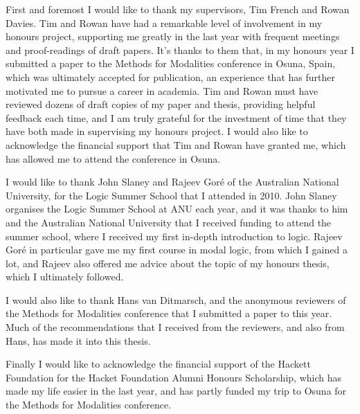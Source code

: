 \begin{acknowledgements}
First and foremost I would like to thank my supervisors, Tim French and Rowan
Davies. Tim and Rowan have had a remarkable level of involvement in my honours
project, supporting me greatly in the last year with frequent meetings and
proof-readings of draft papers. It's thanks to them that, in my honours year I
submitted a paper to the Methods for Modalities conference in Osuna, Spain,
which was ultimately accepted for publication, an experience that has further
motivated me to pursue a career in academia. Tim and Rowan must have reviewed
dozens of draft copies of my paper and thesis, providing helpful feedback each
time, and I am truly grateful for the investment of time that they have both
made in supervising my honours project. I would also like to acknowledge the
financial support that Tim and Rowan have granted me, which has allowed me to
attend the conference in Osuna.

I would like to thank John Slaney and Rajeev Gor\'{e} of the Australian National
University, for the Logic Summer School that I attended in 2010. John Slaney
organises the Logic Summer School at ANU each year, and it was thanks to him and
the Australian National University that I received funding to attend the summer
school, where I received my first in-depth introduction to logic. Rajeev
Gor\'{e} in particular gave me my first course in modal logic, from which I
gained a lot, and Rajeev also offered me advice about the topic of my honours
thesis, which I ultimately followed.

I would also like to thank Hans van Ditmarsch, and the anonymous reviewers of
the Methods for Modalities conference that I submitted a paper to this year.
Much of the recommendations that I received from the reviewers, and also from
Hans, has made it into this thesis.

Finally I would like to acknowledge the financial support of the Hackett
Foundation for the Hacket Foundation Alumni Honours Scholarship, which has made
my life easier in the last year, and has partly funded my trip to Osuna for the
Methods for Modalities conference.
\end{acknowledgements}

